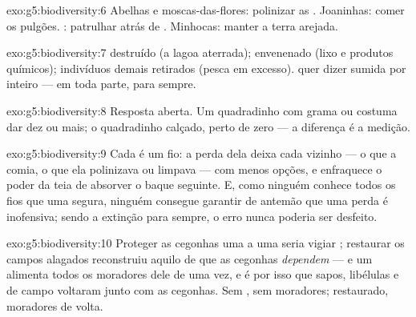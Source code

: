 \begin{solution}{exo:g5:biodiversity:6}
Abelhas e moscas-das-flores: polinizar as . Joaninhas: comer
os pulgões. : patrulhar atrás de . Minhocas: manter a
terra arejada.
\end{solution}

\begin{solution}{exo:g5:biodiversity:7}
 destruído (a lagoa aterrada);  envenenado (lixo e
produtos químicos); indivíduos demais retirados (pesca em excesso).
 quer dizer sumida por inteiro --- em toda parte, para sempre.
\end{solution}

\begin{solution}{exo:g5:biodiversity:8}
Resposta aberta. Um quadradinho com grama ou  costuma dar dez
 ou mais; o quadradinho calçado, perto de zero --- a
diferença é a medição.
\end{solution}

\begin{solution}{exo:g5:biodiversity:9}
Cada  é um fio: a perda dela deixa cada vizinho --- o que a
comia, o que ela polinizava ou limpava --- com menos opções, e
enfraquece o poder da teia de absorver o baque seguinte. E, como
ninguém conhece todos os fios que uma  segura, ninguém
consegue garantir de antemão que uma perda é inofensiva; sendo a
extinção para sempre, o erro nunca poderia ser desfeito.
\end{solution}

\begin{solution}{exo:g5:biodiversity:10}
Proteger as cegonhas uma a uma seria vigiar ; restaurar os
campos alagados reconstruiu aquilo de que as cegonhas
\emph{dependem} --- e um  alimenta todos os moradores dele de
uma vez, e é por isso que sapos, libélulas e  de campo
voltaram junto com as cegonhas. Sem , sem moradores; 
restaurado, moradores de volta.
\end{solution}

